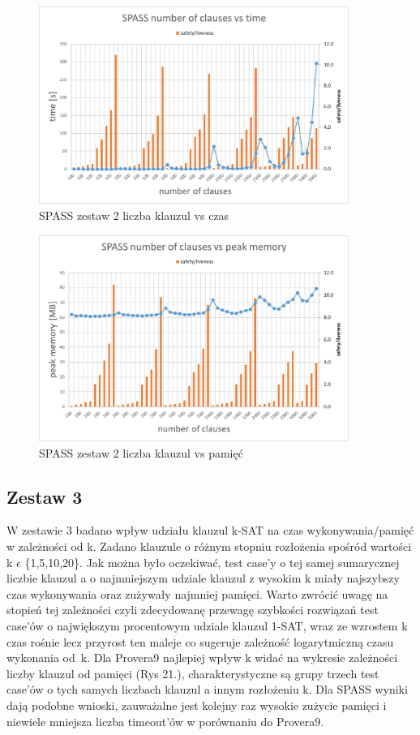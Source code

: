 \documentclass[a4paper,12pt]{article}
\begin{document}
\begin{figure}[H]
  \centerline{\includegraphics[width=0.9\textwidth]{outputs/set2/set2 charts/11 SPASS number of clauses vs time.jpg}}
  \caption{SPASS zestaw 2 liczba klauzul vs czas}
\end{figure}

\begin{figure}[H]
  \centerline{\includegraphics[width=0.9\textwidth]{outputs/set2/set2 charts/12 SPASS number of clauses vs peak memory.jpg}}
  \caption{SPASS zestaw 2 liczba klauzul vs pamięć}
\end{figure}


\subsection{Zestaw 3}

W zestawie 3 badano wpływ udziału klauzul k-SAT na czas wykonywania/pamięć w zależności od k. Zadano klauzule o różnym stopniu rozłożenia spośród wartości k $\epsilon$ \{1,5,10,20\}. Jak można było oczekiwać, test case'y o tej samej sumarycznej liczbie klauzul a o najmniejszym udziale klauzul z wysokim k miały najszybszy czas wykonywania oraz zużywały najmniej pamięci. Warto zwrócić uwagę na stopień tej zależności czyli zdecydowanę przewagę szybkości rozwiązań test case'ów o największym procentowym udziale klauzul 1-SAT, wraz ze wzrostem k czas rośnie lecz przyrost ten maleje co sugeruje zależność logarytmiczną czasu wykonania od~k. Dla Provera9 najlepiej wpływ k widać na wykresie zależności liczby klauzul od pamięci (Rys 21.), charakterystyczne są grupy trzech test case'ów o tych samych liczbach klauzul a innym rozłożeniu k. Dla SPASS wyniki dają podobne wnioski, zauważalne jest kolejny raz wysokie zużycie pamięci i niewiele mniejsza liczba timeout'ów w porównaniu do Provera9.
\end{document}

